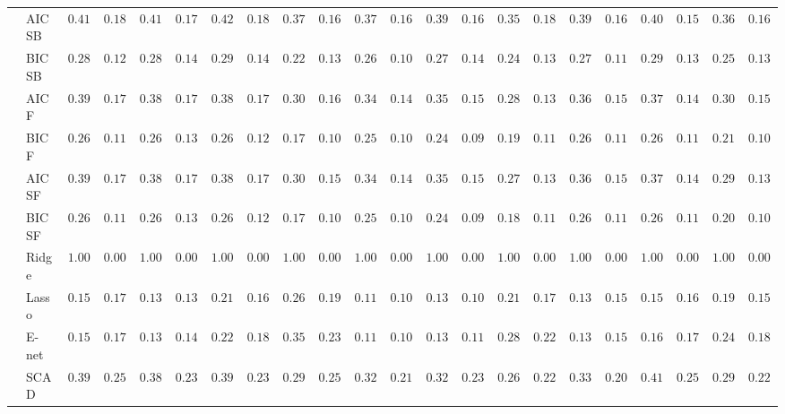 \begin{tabular}{ll|ll|llllll|llllll|llllll}
 & AIC SB  & $0.4150$ & $0.1873$ & $0.4100$ & $0.1748$ & $0.4267$ & $0.1825$ & $0.3767$ & $0.1685$ & $0.3750$ & $0.1665$ & $0.3950$ & $0.1652$ & $0.3517$ & $0.1879$ & $0.3917$ & $0.1681$ & $0.4083$ & $0.1542$ & $0.3667$ & $0.1658$ \\
 & BIC SB  & $0.2800$ & $0.1273$ & $0.2833$ & $0.1489$ & $0.2967$ & $0.1433$ & $0.2283$ & $0.1312$ & $0.2617$ & $0.1039$ & $0.2750$ & $0.1429$ & $0.2400$ & $0.1347$ & $0.2783$ & $0.1162$ & $0.2967$ & $0.1331$ & $0.2550$ & $0.1350$ \\
 & AIC F  & $0.3933$ & $0.1733$ & $0.3850$ & $0.1736$ & $0.3833$ & $0.1781$ & $0.3050$ & $0.1625$ & $0.3450$ & $0.1484$ & $0.3517$ & $0.1533$ & $0.2800$ & $0.1379$ & $0.3667$ & $0.1553$ & $0.3717$ & $0.1496$ & $0.3017$ & $0.1511$ \\
 & BIC F  & $0.2683$ & $0.1158$ & $0.2667$ & $0.1361$ & $0.2600$ & $0.1215$ & $0.1783$ & $0.1066$ & $0.2567$ & $0.1017$ & $0.2467$ & $0.0990$ & $0.1950$ & $0.1186$ & $0.2650$ & $0.1138$ & $0.2667$ & $0.1161$ & $0.2100$ & $0.1076$ \\
 & AIC SF  & $0.3933$ & $0.1733$ & $0.3850$ & $0.1736$ & $0.3833$ & $0.1781$ & $0.3033$ & $0.1596$ & $0.3450$ & $0.1484$ & $0.3517$ & $0.1533$ & $0.2700$ & $0.1377$ & $0.3667$ & $0.1553$ & $0.3700$ & $0.1490$ & $0.2933$ & $0.1384$ \\
 & BIC SF  & $0.2683$ & $0.1158$ & $0.2667$ & $0.1361$ & $0.2600$ & $0.1215$ & $0.1767$ & $0.1055$ & $0.2567$ & $0.1017$ & $0.2467$ & $0.0990$ & $0.1883$ & $0.1128$ & $0.2650$ & $0.1138$ & $0.2667$ & $0.1161$ & $0.2083$ & $0.1043$ \\
 & Ridge  & $1.0000$ & $0.0000$ & $1.0000$ & $0.0000$ & $1.0000$ & $0.0000$ & $1.0000$ & $0.0000$ & $1.0000$ & $0.0000$ & $1.0000$ & $0.0000$ & $1.0000$ & $0.0000$ & $1.0000$ & $0.0000$ & $1.0000$ & $0.0000$ & $1.0000$ & $0.0000$ \\
 & Lasso  & $0.1550$ & $0.1729$ & $0.1300$ & $0.1331$ & $0.2117$ & $0.1689$ & $0.2683$ & $0.1952$ & $0.1183$ & $0.1067$ & $0.1300$ & $0.1075$ & $0.2133$ & $0.1790$ & $0.1317$ & $0.1504$ & $0.1517$ & $0.1626$ & $0.1917$ & $0.1505$ \\
 & E-net  & $0.1567$ & $0.1786$ & $0.1350$ & $0.1415$ & $0.2283$ & $0.1875$ & $0.3500$ & $0.2327$ & $0.1167$ & $0.1073$ & $0.1333$ & $0.1111$ & $0.2833$ & $0.2291$ & $0.1350$ & $0.1566$ & $0.1633$ & $0.1708$ & $0.2467$ & $0.1842$ \\
 & SCAD  & $0.3983$ & $0.2550$ & $0.3867$ & $0.2391$ & $0.3933$ & $0.2351$ & $0.2917$ & $0.2577$ & $0.3233$ & $0.2103$ & $0.3250$ & $0.2373$ & $0.2617$ & $0.2238$ & $0.3317$ & $0.2017$ & $0.4167$ & $0.2524$ & $0.2917$ & $0.2214$ \\

\end{tabular}
